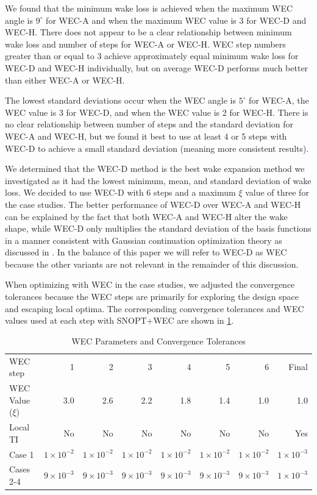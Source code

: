 \documentclass{jpconf}
\begin{document}
We found that the minimum wake loss is achieved when the maximum WEC angle is $9^\circ$ for WEC-A and when the maximum WEC value is 3 for WEC-D and WEC-H. There does not appear to be a clear relationship between minimum wake loss and number of steps for WEC-A or WEC-H. WEC step numbers greater than or equal to 3 achieve approximately equal minimum wake loss for WEC-D and WEC-H individually, but on average WEC-D performs much better than either WEC-A or WEC-H.

The lowest standard deviations occur when the WEC angle is $5^\circ$ for WEC-A, the WEC value is 3 for WEC-D, and when the WEC value is 2 for WEC-H. There is no clear relationship between number of steps and the standard deviation for WEC-A and WEC-H, but we found it best to use at least 4 or 5 steps with WEC-D to achieve a small standard deviation (meaning more consistent results).

We determined that the WEC-D method is the best wake expansion method we investigated as it had the lowest minimum, mean, and standard deviation of wake loss. We decided to use WEC-D with 6 steps and a maximum $\xi$ value of three for the case studies. The better performance of WEC-D over WEC-A and WEC-H can be explained by the fact that both WEC-A and WEC-H alter the wake shape, while WEC-D only multiplies the standard deviation of the basis functions in a manner consistent with Gaussian continuation optimization theory as discussed in \cite{mobahi2015}. In the balance of this paper we will refer to WEC-D as WEC because the other variants are not relevant in the remainder of this discussion. 

When optimizing with WEC in the case studies, we adjusted the convergence tolerances because the WEC steps are primarily for exploring the design space and escaping local optima. The corresponding convergence tolerances and WEC values used at each step with SNOPT+WEC are shown in \cref{tab:wectols}. 

\begin{table}[h!]
	\centering
	\caption{WEC Parameters and Convergence Tolerances}
	\label{tab:wectols}
	\begin{tabular}{lrrrrrrr}
		\toprule		
	WEC step & 1 & 2 & 3 & 4 & 5 & 6 & Final \\
	\cmidrule{2-8}
	WEC Value ($\xi$) & 3.0 & 2.6 & 2.2 & 1.8 & 1.4 & 1.0 & 1.0 \\
	Local TI & No & No & No & No & No & No & Yes \\
	Case 1 &	$1\times10^{-2}$ & $1\times10^{-2}$ & $1\times10^{-2}$ & $1\times10^{-2}$ & $1\times10^{-2}$ & $1\times10^{-2}$ & $1\times10^{-3}$ \\
	Cases 2-4 &	$9\times10^{-3}$ & $9\times10^{-3}$ & $9\times10^{-3}$ & $9\times10^{-3}$ & $9\times10^{-3}$ & $9\times10^{-3}$ & $1\times10^{-3}$ \\
		\bottomrule
	\end{tabular}
\end{table}
\end{document}
